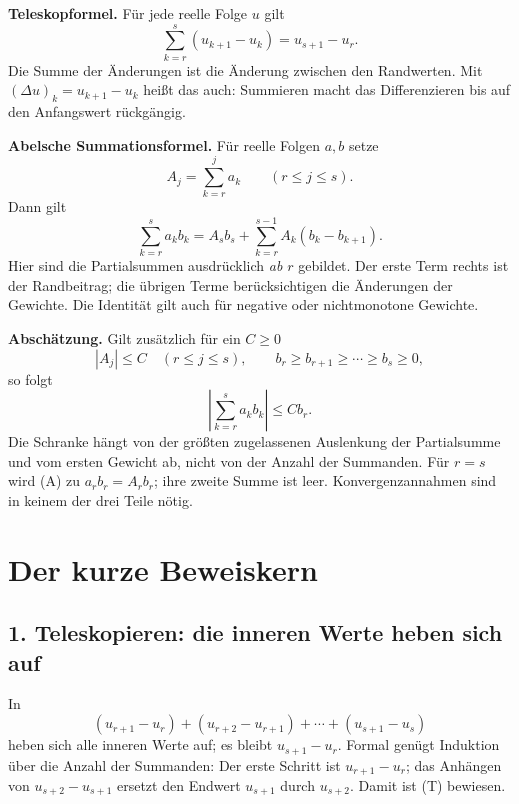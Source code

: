 \textbf{Teleskopformel.} Für jede reelle Folge $u$ gilt
\begin{equation}\tag{T}\label{abel:telescoping}
 \boxed{\displaystyle
 \sum_{k=r}^{s}(u_{k+1}-u_k)=u_{s+1}-u_r.}
\end{equation}
Die Summe der Änderungen ist die Änderung zwischen den Randwerten.
Mit $(\Delta u)_k=u_{k+1}-u_k$ heißt das auch:
Summieren macht das Differenzieren bis auf den Anfangswert rückgängig.

\textbf{Abelsche Summationsformel.} Für reelle Folgen $a,b$ setze
\[
 A_j=\sum_{k=r}^{j}a_k\qquad(r\leq j\leq s).
\]
Dann gilt
\begin{equation}\tag{A}\label{abel:summation}
 \boxed{\displaystyle
 \sum_{k=r}^{s}a_kb_k
 =A_sb_s+\sum_{k=r}^{s-1}A_k(b_k-b_{k+1}).}
\end{equation}
Hier sind die Partialsummen ausdrücklich \emph{ab $r$} gebildet.
Der erste Term rechts ist der Randbeitrag; die übrigen Terme
berücksichtigen die Änderungen der Gewichte. Die Identität gilt
auch für negative oder nichtmonotone Gewichte.

\textbf{Abschätzung.} Gilt zusätzlich für ein $C\geq0$
\[
 |A_j|\leq C\quad(r\leq j\leq s),\qquad
 b_r\geq b_{r+1}\geq\cdots\geq b_s\geq0,
\]
so folgt
\begin{equation}\tag{E}\label{abel:estimate}
 \boxed{\displaystyle
 \left|\sum_{k=r}^{s}a_kb_k\right|\leq Cb_r.}
\end{equation}
Die Schranke hängt von der größten zugelassenen Auslenkung der
Partialsumme und vom ersten Gewicht ab, nicht von der Anzahl der
Summanden. Für $r=s$ wird (A) zu $a_rb_r=A_rb_r$; ihre zweite
Summe ist leer. Konvergenzannahmen sind in keinem der drei Teile nötig.

\section{Der kurze Beweiskern}

\subsection*{1. Teleskopieren: die inneren Werte heben sich auf}

In
\[
 (u_{r+1}-u_r)+(u_{r+2}-u_{r+1})+\cdots+(u_{s+1}-u_s)
\]
heben sich alle inneren Werte auf; es bleibt $u_{s+1}-u_r$.
Formal genügt Induktion über die Anzahl der Summanden:
Der erste Schritt ist $u_{r+1}-u_r$; das Anhängen von
$u_{s+2}-u_{s+1}$ ersetzt den Endwert $u_{s+1}$ durch $u_{s+2}$.
Damit ist (T) bewiesen.

